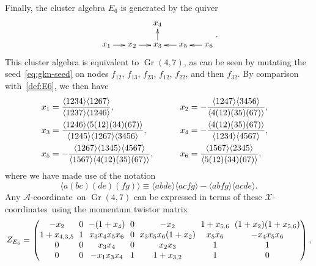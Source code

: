 \documentclass[11pt]{article}
\DeclareMathOperator{\Gr}{Gr}
\def\ket#1{\langle #1 \rangle}
\def\xcoords{$\mathcal{X}$-coordinates}
\def\acoord{$\mathcal{A}$-coordinate}
\begin{document}
Finally, the cluster algebra $E_6$ is generated by the quiver
\begin{equation}\label{def:E6}
    \begin{gathered}
    \begin{xy} 0;<1pt,0pt>:<0pt,-1pt>::
      (0,0) *+{x_1} ="1",
      (30,0) *+{x_2} ="2",
      (60,0) *+{x_3} ="3",
      (60,-25) *+{x_4} ="4",
      (90,0) *+{x_5} ="5",
      (120,0) *+{x_6} ="6",
      "1", {\ar"2"},
      "2", {\ar"3"},
      "3", {\ar"4"},
      "5", {\ar"3"},
      "6", {\ar"5"},
    \end{xy}
    \end{gathered} .
\end{equation}
This cluster algebra is equivalent to $\Gr(4,7)$, as can be seen by mutating the seed~\eqref{eq:gkn-seed} on nodes $f_{12}$, $f_{13}$, $f_{23}$, $f_{12}$, $f_{22}$, and then $f_{32}$. By comparison with~\eqref{def:E6}, we then have 
\begin{align} \label{eq:E6_x_def}
x_1 &= \frac{\ket{1234}\ket{1267}}{\ket{1237} \ket{1246}}, \hspace{13.03ex} \quad \quad 
x_2 = - \frac{\ket{1247} \ket{3456}}{\ket{4(12)(35)(67)}}, \quad \nonumber \\
x_3 &= \frac{\ket{1246} \ket{5(12)(34)(67)}}{\ket{1245} \ket{1267} \ket{3456}}, \hspace{4.12ex} \quad \quad 
x_4 = -\frac{\ket{4(12)(35)(67)}}{\ket{1234} \ket{4567}}, \quad \\
x_5 &= -\frac{\ket{1267} \ket{1345}\ket{4567}}{\ket{1567}\ket{4(12)(35)(67)}}, \quad \quad \quad 
x_6 = \frac{\ket{1567}\ket{2345}}{\ket{5(12)(34)(67)}}, \quad \nonumber
\end{align}
where we have made use of the notation
\begin{equation} \label{eq:twistor_intersection}
\ket{a(bc)(de)(fg)} \equiv \ket{abde}\ket{acfg}-\ket{abfg}\ket{acde}.
\end{equation}
Any \acoord\ on $\Gr(4,7)$ can be expressed in terms of these \xcoords\ using the momentum twistor matrix 
\begin{equation}
Z_{E_6} = 
\begingroup
\setlength\arraycolsep{3pt}
\begin{pmatrix} 
 -x_2 & 0 & -(1+x_4) & 0 & -x_2 & 1+x_{5,6} & (1+x_2) (1+x_{5,6}) \\
 1+x_{4,3,5} & 1 & x_3 x_4 x_5 x_6 & 0 & x_3 x_5 x_6 (1+x_2) & x_5 x_6 & -x_4 x_5 x_6 \\
 0 & 0 & x_3 x_4 & 0 & x_2 x_3 & 1 & 1 \\
 0 & 0 & -x_1 x_3 x_4 & 1 & 1+x_{3,2} & 1 & 0 \\
\end{pmatrix} ,
\endgroup
\end{equation}
\end{document}
